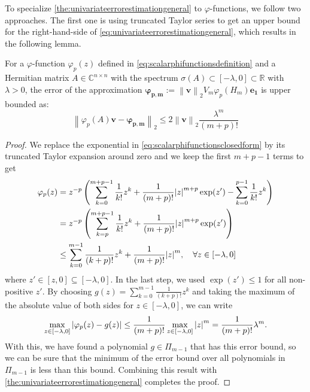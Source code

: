 To specialize \autoref{the:univariateerrorestimationgeneral} to $\varphi$-functions,
we follow two approaches. The first one is using truncated Taylor series to get an
upper bound for the right-hand-side of \eqref{eq:univariateerrorestimationgeneral},
which results in the following lemma.

\begin{lemma}
    \label{lem:univariateerrorestimationphitaylor}
    For a $\varphi$-function $\varphi_p(z)$ defined in \eqref{eq:scalarphifunctionsdefinition}
    and a Hermitian matrix $A \in \mathbb{C}^{n \times n}$ with the spectrum
    $\sigma(A) \subset [-\lambda, 0] \subset \mathbb{R}$ with $\lambda > 0$,
    the error of the approximation
    $\mathbf{\varphi_{p, m}} := \left\| \mathbf{v} \right\|_{2} V_m \varphi_p(H_m) \mathbf{e_1}$
    is upper bounded as:
    \begin{equation}
        \label{eq:univariateerrorestimationphitaylor}
        \left\| \varphi_p(A)\mathbf{v} - \mathbf{\varphi_{p, m}} \right\|_2 \le 2 \left\| \mathbf{v} \right\|_2
        \frac{\lambda^m}{(m+p)!}
    \end{equation}
\end{lemma}
\begin{proof}
    We replace the exponential in \eqref{eq:scalarphifunctionsclosedform} by its
    truncated Taylor expansion around zero and we keep the first $m+p-1$ terms to get
    \begin{equation*}
        \begin{aligned}
            \varphi_p(z) & = z^{-p} \left( \sum_{k=0}^{m+p-1}{\frac{1}{k!}z^k}
                + \frac{1}{(m+p)!} \abs{z}^{m+p} \exp(z') - \sum_{k=0}^{p-1}{\frac{1}{k!}z^{k}} \right)\\
            & = z^{-p} \left( \sum_{k=p}^{m+p-1}{\frac{1}{k!}z^k} + \frac{1}{(m+p)!} \abs{z}^{m+p} \exp(z') \right)\\
            & \le \sum_{k=0}^{m-1}{\frac{1}{(k+p)!}z^k} + \frac{1}{(m+p)!} \abs{z}^{m}, \quad \forall z \in [-\lambda, 0]
            \end{aligned}
    \end{equation*}
    where $z' \in [z, 0] \subseteq [-\lambda, 0]$. In the last step, we used $\exp(z') \le 1$ for all
    non-positive $z'$. By choosing $g(z) = \sum_{k=0}^{m-1}{\frac{1}{(k+p)!}z^k}$ and
    taking the maximum of the absolute value of both sides for $z \in [-\lambda, 0]$,
    we can write
    \begin{equation*}
        \max_{z \in [-\lambda, 0]}\left| \varphi_p(z) - g(z) \right|
        \le \frac{1}{(m+p)!} \max_{z \in [-\lambda, 0]}\abs{z}^{m}
        = \frac{1}{(m+p)!} \lambda^m.
    \end{equation*}
    With this, we have found a polynomial $g \in \Pi_{m-1}$ that has this error bound,
    so we can be sure that the minimum of the error bound over all polynomials in
    $\Pi_{m-1}$ is less than this bound. Combining this result with
    \autoref{the:univariateerrorestimationgeneral} completes the proof.
\end{proof}

